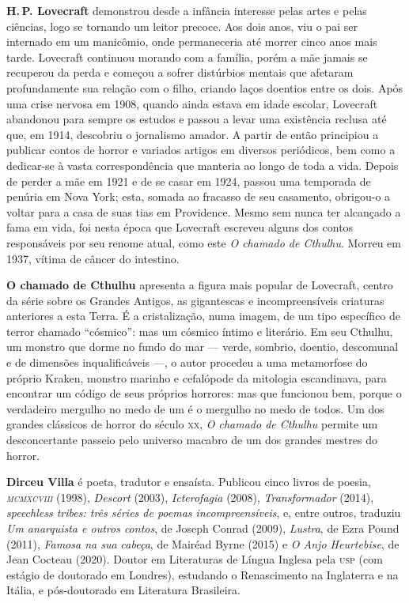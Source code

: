\textbf{H.\,P. Lovecraft} demonstrou desde a infância interesse pelas artes e
pelas ciências, logo se tornando um leitor precoce. Aos dois anos, viu o pai ser internado em um manicômio, onde permaneceria até
morrer cinco anos mais tarde. Lovecraft continuou morando com a família,
porém a mãe jamais se recuperou da perda e começou a sofrer 
distúrbios mentais que afetaram profundamente sua relação com o filho,
criando laços doentios entre os dois. Após uma crise nervosa em 1908,
quando ainda estava em idade escolar, Lovecraft abandonou para sempre os
estudos e passou a levar uma existência reclusa até que, em 1914,
descobriu o jornalismo amador. A partir de então principiou a publicar
contos de horror e variados artigos em diversos periódicos, bem como a dedicar-se à vasta
correspondência que manteria ao longo de toda a vida.
Depois de perder a mãe em 1921 e de se casar em 1924, passou uma temporada
de penúria em Nova York; esta, somada ao fracasso de seu casamento,
obrigou-o a voltar para a casa de suas tias em Providence.
Mesmo sem nunca ter alcançado a fama em vida, foi nesta época que
Lovecraft escreveu alguns dos contos responsáveis por seu renome atual,
como este \emph{O chamado de Cthulhu}.
Morreu em 1937, vítima de câncer do intestino.

\textbf{O chamado de Cthulhu} apresenta a figura mais popular de Lovecraft, centro da série sobre os Grandes Antigos, as gigantescas e incompreensíveis criaturas anteriores a esta Terra. É a cristalização, numa imagem, de um tipo específico de terror chamado ``cósmico'': mas um cósmico íntimo e literário. Em seu Cthulhu, um monstro que dorme no fundo do mar --- verde, sombrio, doentio, descomunal e de dimensões inqualificáveis ---, o autor procedeu a uma metamorfose do próprio Kraken, monstro marinho e cefalópode da mitologia escandinava, para encontrar um código de seus próprios horrores: mas que funcionou bem, porque o verdadeiro mergulho no medo de um é o mergulho no medo de todos. Um dos grandes clássicos de horror do século \textsc{xx}, \textit{O chamado de Cthulhu} permite um desconcertante passeio pelo universo macabro de um dos grandes mestres do horror.

 
\textbf{Dirceu Villa} é poeta, tradutor e ensaísta. Publicou cinco livros de poesia, \emph{\textsc{mcmxcviii}} (1998), \emph{Descort} (2003), \emph{Icterofagia} (2008), \emph{Transformador} (2014), \emph{speechless tribes: três séries de poemas incompreensíveis}, e, entre outros, traduziu \emph{Um anarquista e outros contos}, de Joseph Conrad (2009), \emph{Lustra}, de Ezra Pound (2011), \emph{Famosa na sua cabeça}, de Mairéad Byrne (2015) e \emph{O Anjo Heurtebise}, de Jean Cocteau (2020). Doutor em Literaturas de Língua Inglesa pela \textsc{usp} (com estágio de doutorado em Londres), estudando o Renascimento na Inglaterra e na Itália, e pós-doutorado em Literatura Brasileira.

